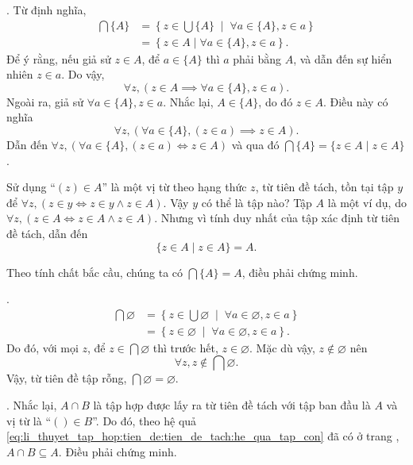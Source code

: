 \setcounter{subexercise}{1}
. Từ định nghĩa,
\begin{align*}
   \bigcap \{A\} &= \left\{z \in \bigcup \{A\} \;\middle|\; \forall a \in \{A\}, z\in a\right\} \\
      &= \left\{z \in A \mid \forall a \in \{A\}, z \in a\right\}.
\end{align*}
Để ý rằng, nếu giả sử $z \in A$, để $a \in \{A\}$ thì $a$ phải bằng $A$, và dẫn đến sự hiển nhiên $z \in a$. Do vậy,
\begin{equation*}
   \forall z, \left(z \in A \implies \forall a \in \{A\}, z \in a\right).
\end{equation*}
Ngoài ra, giả sử $\forall a \in \{A\}, z \in a$. Nhắc lại, $A \in \{A\}$, do đó $z \in A$. Điều này có nghĩa
\begin{equation*}
   \forall z, \left(\forall a \in \{A\}, (z \in a) \implies z \in A\right).
\end{equation*}
Dẫn đến $\forall z, \left(\forall a \in \{A\}, (z \in a) \iff z \in A\right)$ và qua đó $\bigcap \{A\} = \{z \in A \mid z \in A\}$. 

Sử dụng ``$(z) \in A$'' là một vị từ theo hạng thức $z$, từ tiên đề tách, tồn tại tập $y$ để $\forall z, (z \in y \iff z \in y \land z \in A)$. Vậy $y$ có thể là tập nào? Tập $A$ là một ví dụ, do $\forall z, (z \in A \iff z \in A \land z \in A)$. Nhưng vì tính duy nhất của tập xác định từ tiên đề tách, dẫn đến
\begin{equation*}
   \{z \in A \mid z \in A\} = A.
\end{equation*}

Theo tính chất bắc cầu, chúng ta có $\bigcap \{A\} = A$, điều phải chứng minh.

. 
\begin{align*}
   \bigcap \varnothing &= \left\{z \in \bigcup \varnothing \;\middle|\; \forall a \in \varnothing, z\in a\right\} \\ 
   &= \left\{z \in \varnothing \;\middle|\; \forall a \in \varnothing, z\in a\right\}.
\end{align*}
Do đó, với mọi $z$, để $z \in \bigcap \varnothing$ thì trước hết, $z \in \varnothing$. Mặc dù vậy, $z \notin \varnothing$ nên 
\begin{equation*}
   \forall z, z \notin \bigcap \varnothing.
\end{equation*}
Vậy, từ tiên đề tập rỗng, $\bigcap \varnothing = \varnothing$.

. Nhắc lại, $A \cap B$ là tập hợp được lấy ra từ tiên đề tách với tập ban đầu là $A$ và vị từ là ``$() \in B$''. Do đó, theo hệ quả \eqref{eq:li_thuyet_tap_hop:tien_de:tien_de_tach:he_qua_tap_con} đã có ở trang \pageref{eq:li_thuyet_tap_hop:tien_de:tien_de_tach:he_qua_tap_con}, $A \cap B \subseteq A$. Điều phải chứng minh.

